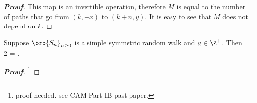 \begin{proof}[\bf Proof]
%
%
%
%
%
%
%
%
%
%
%
%


This map is an invertible operation, therefore $M$ is equal to the number of paths that go from $(k,-x)$ to $(k+n,y)$. It is easy to see that $M$ does not depend on $k$.
\end{proof}

\begin{corollary}
Suppose $\brb{S_n}_{n\geq 0}$ is a simple symmetric random walk and $a\in \Z^+$. Then
\be
\pro{} = 2\pro{} = \pro{}.
\ee
\end{corollary}

\begin{proof}[\bf Proof]
\footnote{proof needed. see CAM Part IB past paper.}
\end{proof}




